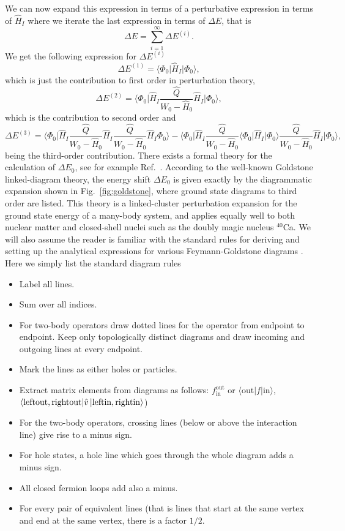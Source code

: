   We can now expand this expression in terms of a perturbative expression in
  terms of $\hat{H}_I$ where we iterate the last expression in terms
  of $\Delta E$, that is 
  \[
  \Delta E=\sum_{i=1}^{\infty}\Delta E^{(i)}.
  \]
  We get the following expression for $\Delta E^{(i)}$
  \[
  \Delta E^{(1)}=\langle \Phi_0\vert \hat{H}_I\vert \Phi_0\rangle,
  \] 
  which is just the contribution to first order in perturbation
  theory,
  \[
  \Delta E^{(2)}=\langle\Phi_0\vert
  \hat{H}_I\frac{\hat{Q}}{W_0-\hat{H}_0}\hat{H}_I\vert \Phi_0\rangle,
  \]
  which is the contribution to second order and
  \[
  \Delta E^{(3)}=\langle \Phi_0\vert
  \hat{H}_I\frac{\hat{Q}}{W_0-\hat{H}_0}\hat{H}_I\frac{\hat{Q}}{W_0-\hat{H}_0}\hat{H}_I\Phi_0\rangle-
  \langle\Phi_0\vert \hat{H}_I\frac{\hat{Q}}{W_0-\hat{H}_0}\langle
  \Phi_0\vert \hat{H}_I\vert
  \Phi_0\rangle\frac{\hat{Q}}{W_0-\hat{H}_0}\hat{H}_I\vert
  \Phi_0\rangle,
  \]
  being the third-order contribution.
  There exists a formal theory for the calculation
  of $\Delta E_0$, see for example Ref.~\cite{shavittbartlett2009}.  According to the well-known Goldstone
  linked-diagram theory, the energy shift $\Delta E_0$ is given
  exactly by the diagrammatic expansion shown in
  Fig.~\ref{fig:goldstone}, where ground state diagrams to third order are listed. This theory is a linked-cluster
  perturbation expansion for the ground state energy of a many-body
  system, and applies equally well to both nuclear matter and
  closed-shell nuclei such as the doubly magic nucleus $^{40}$Ca.  
We will also assume the reader is familiar 
with the standard rules for deriving and setting up the analytical expressions for various Feymann-Goldstone diagrams \cite{svavittbartlett2009}.
Here we simply list the standard diagram rules
 \begin{itemize}
        \item Label all lines.
        \item Sum over all indices. 
        \item For two-body operators draw dotted lines for the operator from endpoint to endpoint. 
Keep only topologically distinct diagrams and draw incoming and outgoing lines at every endpoint.
\item Mark the lines as either holes or particles. 
        \item Extract matrix elements from diagrams as follows: $f_{\mathrm{in}}^{\mathrm{out}}$ or 
$\langle \mathrm{out}|f|\mathrm{in}\rangle$, 
            $\langle \mathrm{leftout, rightout}|\hat{v}\,|{\mathrm{leftin, rightin}}\rangle$)
\item For the two-body operators, crossing lines (below or above the interaction line) 
give rise to a minus sign.
\item For hole states, a hole line which goes through the whole diagram adds a minus sign.  
\item All closed fermion loops add also a minus.
\item For every pair of equivalent lines (that is lines that start at the same vertex and end at the same vertex, there is  a factor $1/2$.
    \end{itemize}
